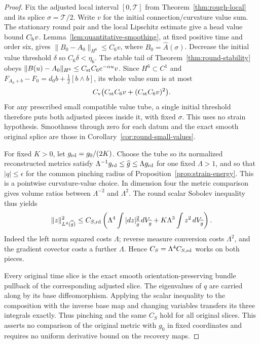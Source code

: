 \documentclass[11pt]{article}
\numberwithin{equation}{section}
\theoremstyle{definition}
\theoremstyle{remark}
\begin{document}
\begin{proof}
Fix the adjusted local interval \([0,\mathcal T]\) from
Theorem~\ref{thm:rough-local} and its splice
\(\sigma=\mathcal T/2\). Write \(v\) for the initial
connection/curvature value sum.
The stationary round pair and the local Lipschitz estimate
give a head value bound \(C_{\rm h}v\).
Lemma~\ref{lem:quantitative-smoothing}, at fixed positive
time and order six, gives
\(\|B_0-A_0\|_{H^6}\le C_6v\), where
\(B_0=\widehat A(\sigma)\). Decrease the initial value
threshold \(\delta\) so \(C_6\delta<\eta_6\).
The stable tail of Theorem~\ref{thm:round-stability} obeys
\(\|B(u)-A_0\|_{H^6}\le C_{\rm st}C_6e^{-\alpha u}v\).
Since \(H^6\subset C^1\) and
\(F_{A_0+b}-F_0=d_0b+\tfrac12[b\wedge b]\), its whole
value sum is at most
\[
 C_{\rm v}\big(C_{\rm st}C_6v+(C_{\rm st}C_6v)^2\big).
\]
For any prescribed small compatible value tube, a single
initial threshold therefore puts both adjusted pieces inside
it, with fixed \(\sigma\). This uses no strain hypothesis.
Smoothness through zero for each datum and the exact smooth
original splice are those in Corollary~\ref{cor:round-small-values}.

For fixed \(K>0\), let \(g_{\rm rd}=g_0/(2K)\).
Choose the tube so its normalized reconstructed metrics
satisfy \(\Lambda^{-1}g_{\rm rd}\le\widehat g\le\Lambda g_{\rm rd}\)
for one fixed \(\Lambda>1\), and so that \(|q|\le\epsilon\)
for the common pinching radius of
Proposition~\ref{prop:strain-energy}.
This is a pointwise curvature-value choice.
In dimension four the metric comparison gives volume
ratios between \(\Lambda^{-2}\) and \(\Lambda^2\).
The round scalar Sobolev inequality thus yields
\[
 \|z\|_{L^4(\widehat g)}^2
 \le C_{S,\rm rd}\left(
       \Lambda^4\int|dz|_{\widehat g}^2\,dV_{\widehat g}
       +K\Lambda^3\int z^2\,dV_{\widehat g}\right).
\]
Indeed the left norm squared costs \(\Lambda\); reverse
measure conversion costs \(\Lambda^2\), and the gradient
covector costs a further \(\Lambda\).
Hence \(C_S=\Lambda^4C_{S,\rm rd}\) works on both pieces.

Every original time slice is the exact smooth
orientation-preserving bundle pullback of the corresponding
adjusted slice. The eigenvalues of \(q\) are carried along
by its base diffeomorphism. Applying the scalar inequality
to the composition with the inverse base map and changing
variables transfers its three integrals exactly.
Thus pinching and the same \(C_S\) hold for all original
slices. This asserts no comparison of the original metric
with \(g_0\) in fixed coordinates and requires no uniform
derivative bound on the recovery maps.


\end{proof}
\end{document}

